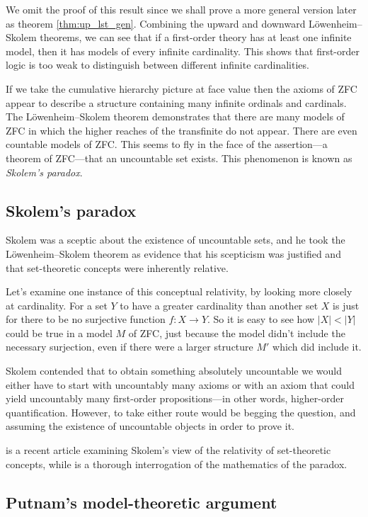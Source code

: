 \documentclass[10pt, a4paper, oneside]{article}
\theoremstyle{definition}
\theoremstyle{remark}
\theoremstyle{plain}
\theoremstyle{plain}
\begin{document}
We omit the proof of this result since we shall prove a more general version
later as theorem \ref{thm:up_lst_gen}. Combining the upward and downward
Löwenheim--Skolem theorems, we can see that if a first-order theory has at
least one infinite model, then it has models of every infinite cardinality. This
shows that first-order logic is too weak to distinguish between different
infinite cardinalities.

If we take the cumulative hierarchy picture at face value then the axioms of ZFC
appear to describe a structure containing many infinite ordinals and cardinals.
The Löwenheim--Skolem theorem demonstrates that there are many models of ZFC in
which the higher reaches of the transfinite do not appear. There are even
countable models of ZFC. This seems to fly in the face of the assertion---a
theorem of ZFC---that an uncountable set exists. This phenomenon is known as
\emph{Skolem's paradox}.

\subsection{Skolem's paradox}

Skolem was a sceptic about the existence of uncountable sets, and he took the
Löwenheim--Skolem theorem as evidence that his scepticism was justified and
that set-theoretic concepts were inherently relative.

Let's examine one instance of this conceptual relativity, by looking more
closely at cardinality. For a set $Y$ to have a greater cardinality than another
set $X$ is just for there to be no surjective function $f : X \rightarrow Y$. So
it is easy to see how $|X| < |Y|$ could be true in a model $M$ of ZFC, just
because the model didn't include the necessary surjection, even if there were a
larger structure $M'$ which did include it.

Skolem contended that to obtain something absolutely uncountable we would either
have to start with uncountably many axioms or with an axiom that could yield
uncountably many first-order propositions---in other words, higher-order
quantification. However, to take either route would be begging the question,
and assuming the existence of uncountable objects in order to prove it.

\citet{jane2001} is a recent article examining Skolem's view of the relativity
of set-theoretic concepts, while \citet{bays2007} is a thorough interrogation of
the mathematics of the paradox.

\subsection{Putnam's model-theoretic argument}
\end{document}
